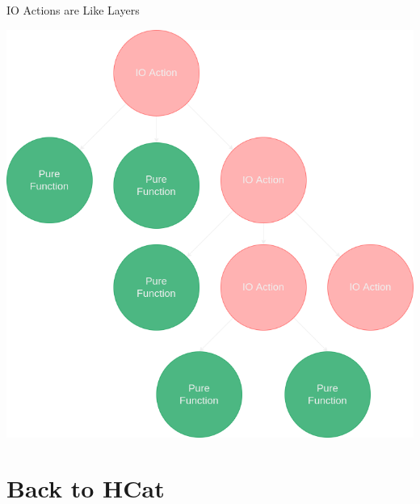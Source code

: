 \documentclass[10pt, presentation, colorlinks]{beamer}
\begin{document}
\begin{frame}[label={sec:org8f1ec63}]{IO Actions are Like Layers}
\begin{center}
\includegraphics[height=0.6\textheight]{img/tree.png}
\end{center}
\end{frame}

\section{Back to HCat}
\label{sec:org94c519c}
\end{document}
